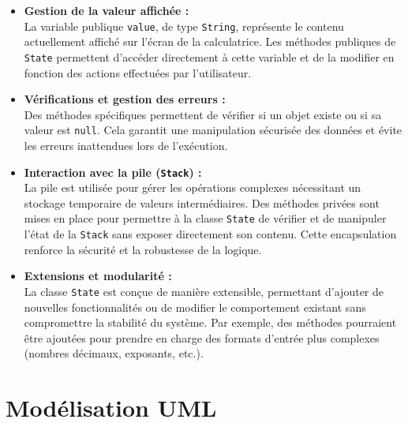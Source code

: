 \documentclass[12pt, a4paper, onecolumn]{article}
\begin{document}
\begin{itemize}
\item \textbf{Gestion de la valeur affichée :} \\
La variable publique \texttt{value}, de type \texttt{String}, représente le contenu actuellement affiché sur l'écran de la calculatrice. Les méthodes publiques de \texttt{State} permettent d'accéder directement à cette variable et de la modifier en fonction des actions effectuées par l'utilisateur.

\item \textbf{Vérifications et gestion des erreurs :} \\
Des méthodes spécifiques permettent de vérifier si un objet existe ou si sa valeur est \texttt{null}. Cela garantit une manipulation sécurisée des données et évite les erreurs inattendues lors de l'exécution.

\item \textbf{Interaction avec la pile (\texttt{Stack}) :} \\
La pile est utilisée pour gérer les opérations complexes nécessitant un stockage temporaire de valeurs intermédiaires. Des méthodes privées sont mises en place pour permettre à la classe \texttt{State} de vérifier et de manipuler l'état de la \texttt{Stack} sans exposer directement son contenu. Cette encapsulation renforce la sécurité et la robustesse de la logique.

\item \textbf{Extensions et modularité :} \\
La classe \texttt{State} est conçue de manière extensible, permettant d'ajouter de nouvelles fonctionnalités ou de modifier le comportement existant sans compromettre la stabilité du système. Par exemple, des méthodes pourraient être ajoutées pour prendre en charge des formats d'entrée plus complexes (nombres décimaux, exposants, etc.).
\end{itemize}


	
\section{Modélisation UML}
\end{document}

